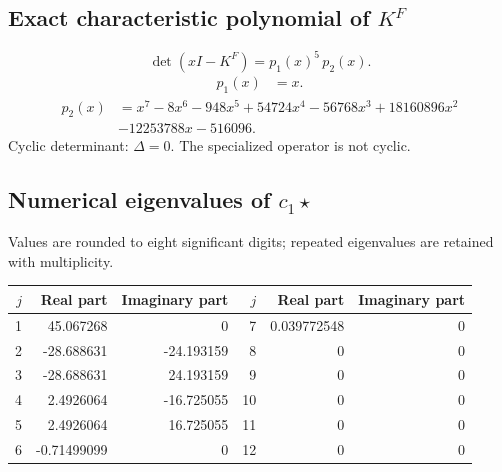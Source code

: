 \documentclass[10pt,a4paper]{article}
\begin{document}
\subsection*{Exact characteristic polynomial of $K^F$}
\[\det(xI-K^F)=p_{1}(x)^{5}\,p_{2}(x).\]
\[\begin{aligned}p_{1}(x)&=x.\end{aligned}\]
\[\begin{aligned}p_{2}(x)&=x^{7} - 8 x^{6} - 948 x^{5} + 54724 x^{4} - 56768 x^{3} + 18160896 x^{2}\\&- 12253788 x - 516096.\end{aligned}\]
Cyclic determinant: $\Delta=0$. The specialized operator is not cyclic.
\subsection*{Numerical eigenvalues of $c_1\star$}
Values are rounded to eight significant digits; repeated eigenvalues are retained with multiplicity.
\begin{center}\small\begin{tabular}{rrr@{\qquad}rrr}\toprule $j$ & Real part & Imaginary part & $j$ & Real part & Imaginary part\\\midrule
1 & 45.067268 & 0 & 7 & 0.039772548 & 0\\
2 & -28.688631 & -24.193159 & 8 & 0 & 0\\
3 & -28.688631 & 24.193159 & 9 & 0 & 0\\
4 & 2.4926064 & -16.725055 & 10 & 0 & 0\\
5 & 2.4926064 & 16.725055 & 11 & 0 & 0\\
6 & -0.71499099 & 0 & 12 & 0 & 0\\
\bottomrule\end{tabular}\end{center}
\end{document}
